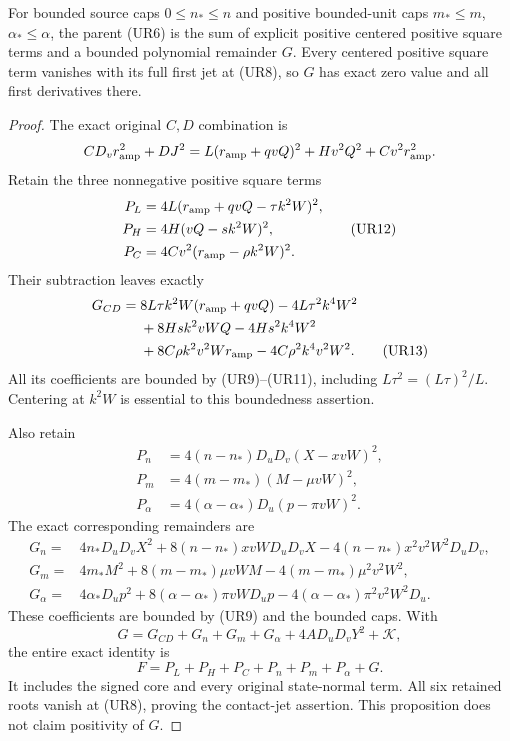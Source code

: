 \begin{proposition}
\label{pc3daa35e9a9b:prop:ui-bounded-remainder}
For bounded source caps $0\le n_*\le n$ and positive bounded-unit
caps $m_*\le m$, $\alpha_*\le\alpha$, the parent (UR6) is the sum
of explicit positive centered positive square terms and a bounded polynomial
remainder $G$. Every centered positive square term vanishes with its full first jet
at (UR8), so $G$ has exact zero value and all first derivatives there.
\end{proposition}
\begin{proof}
The exact original $C,D$ combination is
\[
 CD_vr_{\rm amp}^2+DJ^2
   =L(r_{\rm amp}+qvQ)^2+Hv^2Q^2+Cv^2r_{\rm amp}^2.
\]
Retain the three nonnegative positive square terms
\[
 \begin{aligned}
 P_L&=4L(r_{\rm amp}+qvQ-\tau k^2W)^2,\\
 P_H&=4H(vQ-sk^2W)^2,\\
 P_C&=4Cv^2(r_{\rm amp}-\rho k^2W)^2.
 \end{aligned}                                                   \tag{UR12}
\]
Their subtraction leaves exactly
\begin{align*}
 G_{CD}={}&8L\tau k^2W(r_{\rm amp}+qvQ)-4L\tau^2k^4W^2\\
 &+8Hs k^2vWQ-4Hs^2k^4W^2\\
 &+8C\rho k^2v^2Wr_{\rm amp}-4C\rho^2k^4v^2W^2.
 \tag{UR13}
\end{align*}
All its coefficients are bounded by (UR9)--(UR11), including
$L\tau^2=(L\tau)^2/L$. Centering at $k^2W$ is essential to this
boundedness assertion.

Also retain
\[
 \begin{aligned}
 P_n&=4(n-n_*)D_uD_v(X-xvW)^2,\\
 P_m&=4(m-m_*)(M-\mu vW)^2,\\
 P_\alpha&=4(\alpha-\alpha_*)D_u(p-\pi vW)^2.
 \end{aligned}                                                   \tag{UR14}
\]
The exact corresponding remainders are
\[
 \begin{aligned}
 G_n={}&4n_*D_uD_vX^2+8(n-n_*)xvWD_uD_vX
                    -4(n-n_*)x^2v^2W^2D_uD_v,\\
 G_m={}&4m_*M^2+8(m-m_*)\mu vWM
                    -4(m-m_*)\mu^2v^2W^2,\\
 G_\alpha={}&4\alpha_*D_up^2+8(\alpha-\alpha_*)\pi vWD_up
                    -4(\alpha-\alpha_*)\pi^2v^2W^2D_u.
 \end{aligned}                                                   \tag{UR15}
\]
These coefficients are bounded by (UR9) and the bounded caps. With
\[
 G=G_{CD}+G_n+G_m+G_\alpha+4AD_uD_vY^2+\mathcal K,
\]
the entire exact identity is
\[
 F=P_L+P_H+P_C+P_n+P_m+P_\alpha+G.                 \tag{UR16}
 \label{pc3daa35e9a9b:eq:ui-entire-reduction}
\]
It includes the signed core and every original state-normal term.
All six retained roots vanish at (UR8), proving the contact-jet
assertion. This proposition does not claim positivity of $G$.
\end{proof}

